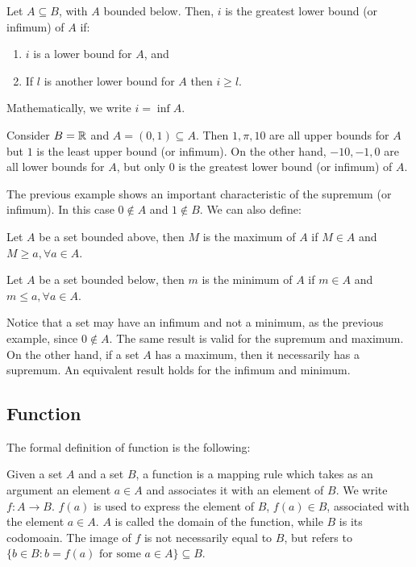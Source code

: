 \begin{definition}[Infimum]
    Let $A \subseteq B$, with $A$ bounded below. Then, $i$ is the greatest lower bound (or infimum) of $A$ if:
    \begin{enumerate}
        \item $i$ is a lower bound for $A$, and
        \item If $l$ is another lower bound for $A$ then $i \geq l$.
    \end{enumerate}
    Mathematically, we write $i = \inf A$.
\end{definition}

\begin{eg}
    Consider $B = \mathbb{R}$ and $A = (0,1) \subseteq A$. Then $1, \pi, 10$ are all upper bounds for $A$ but $1$ is the least upper bound (or infimum). On the other hand, $-10, -1, 0$ are all lower bounds for $A$, but only $0$ is the greatest lower bound (or infimum) of $A$.
\end{eg}

The previous example shows an important characteristic of the supremum (or infimum). In this case $0 \notin A$ and $1 \notin B$. We can also define:

\begin{definition}[Maximum]
    Let $A$ be a set bounded above, then $M$ is the maximum of $A$ if $M \in A$ and $M \geq a, \forall a \in A$.
\end{definition}

\begin{definition}[Minimum]
    Let $A$ be a set bounded below, then $m$ is the minimum of $A$ if $m \in A$ and $m \leq a, \forall a \in A$.
\end{definition}

\begin{remark}
    Notice that a set may have an infimum and not a minimum, as the previous example, since $0 \notin A$. The same result is valid for the supremum and maximum. On the other hand, if a set $A$ has a maximum, then it necessarily has a supremum. An equivalent result holds for the infimum and minimum.
\end{remark}

\subsection{Function}

The formal definition of function is the following:

\begin{definition}[Function]
    Given a set $A$ and a set $B$, a function is a mapping rule which takes as an argument an element $a \in A$ and associates it with an element of $B$. We write $f: A \to B$. $f(a)$ is used to express the element of $B$, $f(a) \in B$, associated with the element $a \in A$. $A$ is called the domain of the function, while $B$ is its codomoain. The image of $f$ is not necessarily equal to $B$, but refers to $\{b \in B: b = f(a) \text{ for some } a \in A\} \subseteq B$.
\end{definition}

